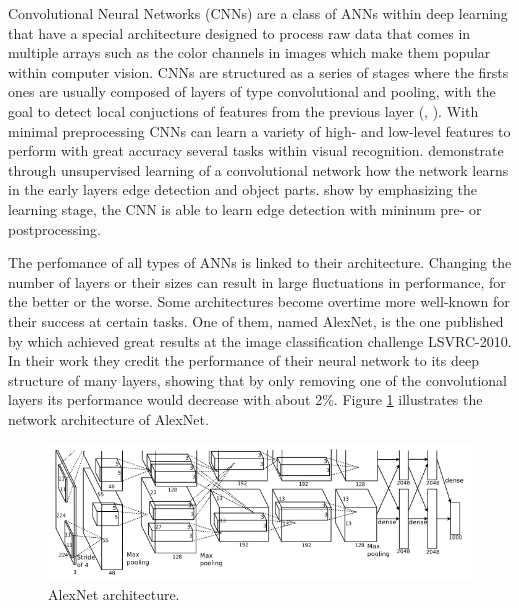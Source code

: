 Convolutional Neural Networks (CNNs) are a class of ANNs within deep learning that have a special architecture designed to process raw data that comes in multiple arrays such as the color channels in images which make them popular within computer vision. CNNs are structured as a series of stages where the firsts ones are usually composed of layers of type convolutional and pooling, with the goal to detect local conjuctions of features from the previous layer (\parencite{Lecun2015}, \parencite{Jarrett2009}). With minimal preprocessing CNNs can learn a variety of high- and low-level features to perform with great accuracy several tasks within visual recognition. \textcite{Lee2009} demonstrate through unsupervised learning of a convolutional network how the network learns in the early layers edge detection and object parts. \textcite{Turaga2010} show by emphasizing the learning stage, the CNN is able to learn edge detection with mininum pre- or postprocessing.

The perfomance of all types of ANNs is linked to their architecture. Changing the number of layers or their sizes can result in large fluctuations in performance, for the better or the worse. Some architectures become overtime more well-known for their success at certain tasks. One of them, named AlexNet, is the one published by \textcite{Krizhevsky2012} which achieved great results at the \textcite{ImageNet} image classification challenge LSVRC-2010. In their work they credit the performance of their neural network to its deep structure of many layers, showing that by only removing one of the convolutional layers its performance would decrease with about 2\%. Figure \ref{fig:alexnet_orig} illustrates the network architecture of AlexNet.

\begin{figure}
	\centering
	\includegraphics[width=\textwidth]{img/methods/alexnet_original.png}
	\caption{AlexNet architecture.}
	\label{fig:alexnet_orig}
\end{figure}

